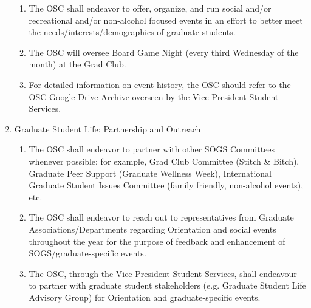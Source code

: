 \begin{enumerate}[label*=\arabic*., align=left]
\begin{enumerate}[label*=\arabic*., align=left]
\item The OSC shall endeavor to offer, organize, and run social and/or recreational and/or non-alcohol focused events in an effort to better meet the needs/interests/demographics of graduate students.
\item The OSC will oversee Board Game Night (every third Wednesday of the month) at the Grad Club.
\item For detailed information on event history, the OSC should refer to the OSC Google Drive Archive overseen by the Vice-President Student Services.
\end{enumerate}
\item Graduate Student Life: Partnership and Outreach
\begin{enumerate}[label*=\arabic*., align=left]	
\item The OSC shall endeavor to partner with other SOGS Committees whenever possible; for example, Grad Club Committee (Stitch \& Bitch), Graduate Peer Support (Graduate Wellness Week), International Graduate Student Issues Committee (family friendly, non-alcohol events), etc.
\item The OSC shall endeavor to reach out to representatives from Graduate Associations/Departments regarding Orientation and social events throughout the year for the purpose of feedback and enhancement of SOGS/graduate-specific events.
\item The OSC, through the Vice-President Student Services, shall endeavour to partner with graduate student stakeholders (e.g. Graduate Student Life Advisory Group) for Orientation and graduate-specific events.
\end{enumerate}
\end{enumerate}